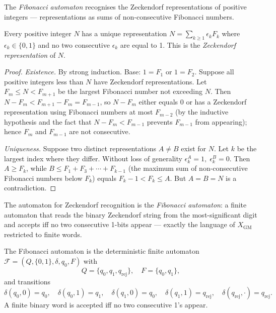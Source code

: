 The \emph{Fibonacci automaton} recognises the Zeckendorf representations
of positive integers --- representations as sums of non-consecutive
Fibonacci numbers.

\begin{theorem}[Zeckendorf, 1972]\label{thm:zeckendorf}
  Every positive integer \(N\) has a unique representation
  \(N = \sum_{k\geq 1} \epsilon_k F_k\) where \(\epsilon_k\in\{0,1\}\)
  and no two consecutive \(\epsilon_k\) are equal to 1.
  This is the \emph{Zeckendorf representation} of \(N\).
\end{theorem}
\begin{proof}
  \emph{Existence.}  By strong induction.  Base: \(1=F_1\) or \(1=F_2\).
  Suppose all positive integers less than \(N\) have Zeckendorf
  representations.  Let \(F_m\leq N < F_{m+1}\) be the largest
  Fibonacci number not exceeding \(N\).  Then
  \(N-F_m < F_{m+1}-F_m=F_{m-1}\), so \(N-F_m\) either equals 0 or
  has a Zeckendorf representation using Fibonacci numbers at most
  \(F_{m-2}\) (by the inductive hypothesis and the fact that
  \(N-F_m<F_{m-1}\) prevents \(F_{m-1}\) from appearing); hence \(F_m\)
  and \(F_{m-1}\) are not consecutive.

  \emph{Uniqueness.}  Suppose two distinct representations \(A\neq B\)
  exist for \(N\).  Let \(k\) be the largest index where they differ.
  Without loss of generality \(\epsilon_k^A=1,\;\epsilon_k^B=0\).
  Then \(A\geq F_k\), while \(B\leq F_1+F_3+\cdots+F_{k-1}\)
  (the maximum sum of non-consecutive Fibonacci numbers below \(F_k\))
  equals \(F_k-1 < F_k\leq A\).  But \(A=B=N\) is a contradiction.
\end{proof}

The automaton for Zeckendorf recognition is the \emph{Fibonacci
automaton}: a finite automaton that reads the binary Zeckendorf
string from the most-significant digit and accepts iff no two
consecutive 1-bits appear --- exactly the language of
\(X_{\mathrm{GM}}\) restricted to finite words.

\begin{definition}\label{def:fib-automaton}
  The Fibonacci automaton is the deterministic finite automaton
  \(\mathcal{F}=(Q,\{0,1\},\delta,q_0,F)\) with
  \[
    Q=\{q_0,q_1,q_{\mathrm{rej}}\},\quad
    F=\{q_0,q_1\},
  \]
  and transitions
  \[
    \delta(q_0,0)=q_0,\quad
    \delta(q_0,1)=q_1,\quad
    \delta(q_1,0)=q_0,\quad
    \delta(q_1,1)=q_{\mathrm{rej}},\quad
    \delta(q_{\mathrm{rej}},\cdot)=q_{\mathrm{rej}}.
  \]
  A finite binary word is accepted iff no two consecutive 1's appear.
\end{definition}

